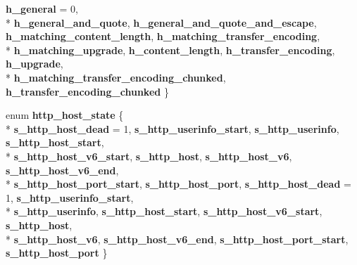 \begin{DoxyCompactItemize}
{\bf h\+\_\+general} = 0, 
\\*
{\bf h\+\_\+general\+\_\+and\+\_\+quote}, 
{\bf h\+\_\+general\+\_\+and\+\_\+quote\+\_\+and\+\_\+escape}, 
{\bf h\+\_\+matching\+\_\+content\+\_\+length}, 
{\bf h\+\_\+matching\+\_\+transfer\+\_\+encoding}, 
\\*
{\bf h\+\_\+matching\+\_\+upgrade}, 
{\bf h\+\_\+content\+\_\+length}, 
{\bf h\+\_\+transfer\+\_\+encoding}, 
{\bf h\+\_\+upgrade}, 
\\*
{\bf h\+\_\+matching\+\_\+transfer\+\_\+encoding\+\_\+chunked}, 
{\bf h\+\_\+transfer\+\_\+encoding\+\_\+chunked}
 \}
\item 
enum {\bf http\+\_\+host\+\_\+state} \{ \\*
{\bf s\+\_\+http\+\_\+host\+\_\+dead} = 1, 
{\bf s\+\_\+http\+\_\+userinfo\+\_\+start}, 
{\bf s\+\_\+http\+\_\+userinfo}, 
{\bf s\+\_\+http\+\_\+host\+\_\+start}, 
\\*
{\bf s\+\_\+http\+\_\+host\+\_\+v6\+\_\+start}, 
{\bf s\+\_\+http\+\_\+host}, 
{\bf s\+\_\+http\+\_\+host\+\_\+v6}, 
{\bf s\+\_\+http\+\_\+host\+\_\+v6\+\_\+end}, 
\\*
{\bf s\+\_\+http\+\_\+host\+\_\+port\+\_\+start}, 
{\bf s\+\_\+http\+\_\+host\+\_\+port}, 
{\bf s\+\_\+http\+\_\+host\+\_\+dead} = 1, 
{\bf s\+\_\+http\+\_\+userinfo\+\_\+start}, 
\\*
{\bf s\+\_\+http\+\_\+userinfo}, 
{\bf s\+\_\+http\+\_\+host\+\_\+start}, 
{\bf s\+\_\+http\+\_\+host\+\_\+v6\+\_\+start}, 
{\bf s\+\_\+http\+\_\+host}, 
\\*
{\bf s\+\_\+http\+\_\+host\+\_\+v6}, 
{\bf s\+\_\+http\+\_\+host\+\_\+v6\+\_\+end}, 
{\bf s\+\_\+http\+\_\+host\+\_\+port\+\_\+start}, 
{\bf s\+\_\+http\+\_\+host\+\_\+port}
 \}
\end{DoxyCompactItemize}
